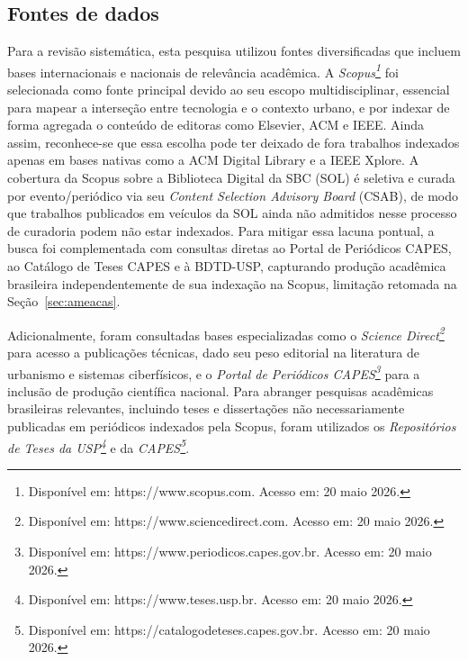 \documentclass[12pt]{article}
\begin{document}
\flushbottom

\subsection{Fontes de dados}

    Para a revisão sistemática, esta pesquisa utilizou fontes diversificadas que incluem bases internacionais e nacionais de relevância acadêmica. A \emph{Scopus\footnote{Disponível em: https://www.scopus.com. Acesso em: 20 maio 2026.}} foi selecionada como fonte principal devido ao seu escopo multidisciplinar, essencial para mapear a interseção entre tecnologia e o contexto urbano, e por indexar de forma agregada o conteúdo de editoras como Elsevier, ACM e IEEE. Ainda assim, reconhece-se que essa escolha pode ter deixado de fora trabalhos indexados apenas em bases nativas como a ACM Digital Library e a IEEE Xplore. A cobertura da Scopus sobre a Biblioteca Digital da SBC (SOL) é seletiva e curada por evento/periódico via seu \textit{Content Selection Advisory Board} (CSAB), de modo que trabalhos publicados em veículos da SOL ainda não admitidos nesse processo de curadoria podem não estar indexados. Para mitigar essa lacuna pontual, a busca foi complementada com consultas diretas ao Portal de Periódicos CAPES, ao Catálogo de Teses CAPES e à BDTD-USP, capturando produção acadêmica brasileira independentemente de sua indexação na Scopus, limitação retomada na Seção~\ref{sec:ameacas}.

    Adicionalmente, foram consultadas bases especializadas como o \emph{Science Direct\footnote{Disponível em: https://www.sciencedirect.com. Acesso em: 20 maio 2026.}} para acesso a publicações técnicas, dado seu peso editorial na literatura de urbanismo e sistemas ciberfísicos, e o \emph{Portal de Periódicos CAPES\footnote{Disponível em: https://www.periodicos.capes.gov.br. Acesso em: 20 maio 2026.}} para a inclusão de produção científica nacional. Para abranger pesquisas acadêmicas brasileiras relevantes, incluindo teses e dissertações não necessariamente publicadas em periódicos indexados pela Scopus, foram utilizados os \emph{Repositórios de Teses da USP\footnote{Disponível em: https://www.teses.usp.br. Acesso em: 20 maio 2026.}} e da \emph{CAPES\footnote{Disponível em: https://catalogodeteses.capes.gov.br. Acesso em: 20 maio 2026.}}.
    
\end{document}
